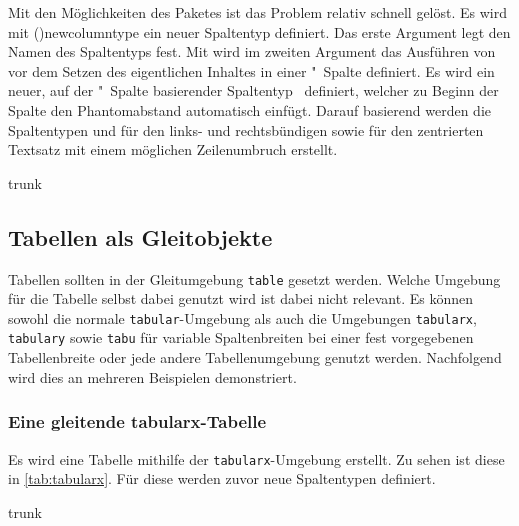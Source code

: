 \documentclass[%
  english,ngerman,%
  cdgeometry=no,DIV=12,%
  cd=false,cdfont=false,cdtitle=true,%
  headings=normal,%
  automark,%
  listof=toc,%
]{tudscrartcl}
\begin{document}
Mit den Möglichkeiten des Paketes  ist das Problem relativ 
schnell gelöst. Es wird mit \Macro(){newcolumntype} ein neuer 
Spaltentyp definiert. Das erste Argument legt den Namen des Spaltentyps fest. 
Mit  wird im zweiten Argument 
das Ausführen von  vor dem Setzen des eigentlichen Inhaltes 
in einer "~Spalte definiert. Es wird ein neuer, auf der 
"~Spalte basierender Spaltentyp~ definiert, welcher zu 
Beginn der Spalte den Phantomabstand automatisch einfügt. Darauf basierend 
werden die Spaltentypen  und  für den links- und 
rechtsbündigen sowie  für den zentrierten Textsatz mit einem 
möglichen Zeilenumbruch erstellt.
%
\begin{Code}[nolst]{trunk}
\subsection{Tabellen als Gleitobjekte}

Tabellen sollten in der Gleitumgebung \texttt{table} gesetzt werden. 
Welche Umgebung für die Tabelle selbst dabei genutzt wird ist dabei
nicht relevant. Es können sowohl die normale \texttt{tabular}-Umgebung 
als auch die Umgebungen \texttt{tabularx}, \texttt{tabulary} sowie 
\texttt{tabu} für variable Spaltenbreiten bei einer fest vorgegebenen 
Tabellenbreite oder jede andere Tabellenumgebung genutzt werden. 
Nachfolgend wird dies an mehreren Beispielen demonstriert.

\subsubsection{Eine gleitende tabularx-Tabelle}

Es wird eine Tabelle mithilfe der \texttt{tabularx}-Umgebung erstellt. 
Zu sehen ist diese in \autoref{tab:tabularx}. Für diese werden zuvor 
neue Spaltentypen definiert.

\end{Code}
\CodeHook{\renewcommand*\newcolumntype[2]{}}
\begin{Code}[input]{trunk}

\end{Code}
\end{document}
